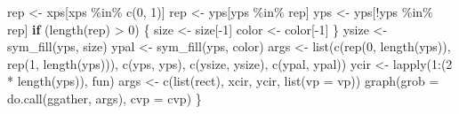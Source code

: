 \documentclass[
]{article}
\newenvironment{Shaded}{\begin{snugshade}}{\end{snugshade}}
\newcommand{\AttributeTok}[1]{\textcolor[rgb]{0.77,0.63,0.00}{#1}}
\newcommand{\ControlFlowTok}[1]{\textcolor[rgb]{0.13,0.29,0.53}{\textbf{#1}}}
\newcommand{\DecValTok}[1]{\textcolor[rgb]{0.00,0.00,0.81}{#1}}
\newcommand{\FunctionTok}[1]{\textcolor[rgb]{0.00,0.00,0.00}{#1}}
\newcommand{\NormalTok}[1]{#1}
\newcommand{\OtherTok}[1]{\textcolor[rgb]{0.56,0.35,0.01}{#1}}
\newcommand{\SpecialCharTok}[1]{\textcolor[rgb]{0.00,0.00,0.00}{#1}}
\begin{document}
\begin{Shaded}
\begin{Highlighting}[]
\NormalTok{  rep }\OtherTok{\textless{}{-}}\NormalTok{ xps[xps }\SpecialCharTok{\%in\%} \FunctionTok{c}\NormalTok{(}\DecValTok{0}\NormalTok{, }\DecValTok{1}\NormalTok{)]}
\NormalTok{  rep }\OtherTok{\textless{}{-}}\NormalTok{ yps[yps }\SpecialCharTok{\%in\%}\NormalTok{ rep]}
\NormalTok{  yps }\OtherTok{\textless{}{-}}\NormalTok{ yps[}\SpecialCharTok{!}\NormalTok{yps }\SpecialCharTok{\%in\%}\NormalTok{ rep]}
  \ControlFlowTok{if}\NormalTok{ (}\FunctionTok{length}\NormalTok{(rep) }\SpecialCharTok{\textgreater{}} \DecValTok{0}\NormalTok{) \{}
\NormalTok{    size }\OtherTok{\textless{}{-}}\NormalTok{ size[}\SpecialCharTok{{-}}\DecValTok{1}\NormalTok{]}
\NormalTok{    color }\OtherTok{\textless{}{-}}\NormalTok{ color[}\SpecialCharTok{{-}}\DecValTok{1}\NormalTok{]}
\NormalTok{  \}}
\NormalTok{  ysize }\OtherTok{\textless{}{-}} \FunctionTok{sym\_fill}\NormalTok{(yps, size)}
\NormalTok{  ypal }\OtherTok{\textless{}{-}} \FunctionTok{sym\_fill}\NormalTok{(yps, color)}
\NormalTok{  args }\OtherTok{\textless{}{-}} \FunctionTok{list}\NormalTok{(}\FunctionTok{c}\NormalTok{(}\FunctionTok{rep}\NormalTok{(}\DecValTok{0}\NormalTok{, }\FunctionTok{length}\NormalTok{(yps)), }\FunctionTok{rep}\NormalTok{(}\DecValTok{1}\NormalTok{, }\FunctionTok{length}\NormalTok{(yps))), }\FunctionTok{c}\NormalTok{(yps, yps),}
    \FunctionTok{c}\NormalTok{(ysize, ysize), }\FunctionTok{c}\NormalTok{(ypal, ypal))}
\NormalTok{  ycir }\OtherTok{\textless{}{-}} \FunctionTok{lapply}\NormalTok{(}\DecValTok{1}\SpecialCharTok{:}\NormalTok{(}\DecValTok{2} \SpecialCharTok{*} \FunctionTok{length}\NormalTok{(yps)), fun)}
\NormalTok{  args }\OtherTok{\textless{}{-}} \FunctionTok{c}\NormalTok{(}\FunctionTok{list}\NormalTok{(rect), xcir, ycir, }\FunctionTok{list}\NormalTok{(}\AttributeTok{vp =}\NormalTok{ vp))}
  \FunctionTok{graph}\NormalTok{(}\AttributeTok{grob =} \FunctionTok{do.call}\NormalTok{(ggather, args), }\AttributeTok{cvp =}\NormalTok{ cvp)}
\NormalTok{\}}


\end{Highlighting}
\end{Shaded}
\end{document}
